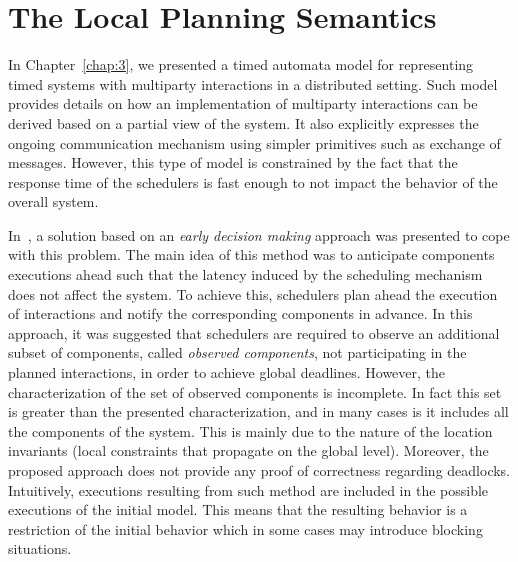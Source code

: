 \chapter{The Local Planning Semantics}\label{chap:5}
\minitoc
\label{sec3}

In Chapter~\ref{chap:3}, we presented a timed automata model for representing timed systems
with multiparty interactions in a distributed setting. Such model provides details on how 
an implementation of multiparty interactions can be derived based on a partial view of 
the system. It also explicitly  expresses the ongoing communication mechanism using simpler 
primitives such as exchange of messages. However, this type of model is constrained by the fact
that the response time of the schedulers is fast enough to not impact the behavior of the 
overall system.

In~\cite{ahlem_these}, a solution based on an \emph{early decision making} approach was 
presented to cope with this problem. The main idea of this method was to anticipate components
executions ahead such that the latency induced by the scheduling mechanism does not affect
the system. To achieve this, schedulers plan ahead the execution of interactions
and notify the corresponding components in advance. 
In this approach, it was suggested that schedulers are required to observe an additional 
subset of components, called \emph{observed components}, not participating in the planned 
interactions, in order to achieve global deadlines. 
However, the characterization of the set of observed components is incomplete. In fact this set
is greater than the presented characterization, and in many cases is it includes all the 
components of the system. This is mainly due to the nature of the location invariants 
(local constraints that propagate on the global level). 
Moreover, the proposed approach does not provide any proof of correctness regarding deadlocks. 
Intuitively, executions resulting from such method are included in the possible executions
of the initial model. This means that the resulting behavior is a restriction of the initial 
behavior which in some cases may introduce blocking situations. 
 
